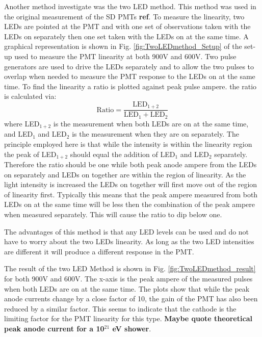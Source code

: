 Another method investigate was the two LED method. This method was used in the original measurement of the SD PMTs \textbf{ref}. To measure the linearity, two LEDs are pointed at the PMT and with one set of observations taken with the LEDs on separately then one set taken with the LEDs on at the same time. A graphical representation is shown in Fig. \ref{fig:TwoLEDmethod_Setup} of the set-up used to measure the PMT linearity at both 900V and 600V. Two pulse generators are used to drive the LEDs separately and to allow the two pulses to overlap when needed to measure the PMT response to the LEDs on at the same time. To find the linearity a ratio is plotted against peak pulse ampere. the ratio is calculated via:
\begin{equation}
\mathrm{Ratio} = \frac{\mathrm{LED}_{1+2}}{\mathrm{LED}_{1} + \mathrm{LED}_{2}}
\end{equation}
where LED$_{1+2}$ is the measurement when both LEDs are on at the same time, and LED$_{1}$ and LED$_2$ is the measurement when they are on separately. The principle employed here is that while the intensity is within the linearity region the peak of LED$_{1+2}$ should equal the addition of LED$_{1}$ and LED$_2$ separately. Therefore the ratio should be one while both peak anode ampere from the LEDs on separately and LEDs on together are within the region of linearity. As the light intensity is increased the LEDs on together will first move out of the region of linearity first. Typically this means that the peak ampere measured from both LEDs on at the same time will be less then the combination of the peak ampere when measured separately. This will cause the ratio to dip below one.

The advantages of this method is that any LED levels can be used and do not have to worry about the two LEDs linearity. As long as the two LED intensities are different it will produce a different response in the PMT. 

The result of the two LED Method is shown in Fig. \ref{fig:TwoLEDmethod_result} for both 900V and 600V. The x-axis is the peak ampere of the measured pulses when both LEDs are on at the same time. The plots show that while the peak anode currents change by a close factor of 10, the gain of the PMT has also been reduced by a similar factor. This seems to indicate that the cathode is the limiting factor for the PMT linearity for this type. \textbf{Maybe quote theoretical peak anode current for a 10$^{21}$ eV shower}.


